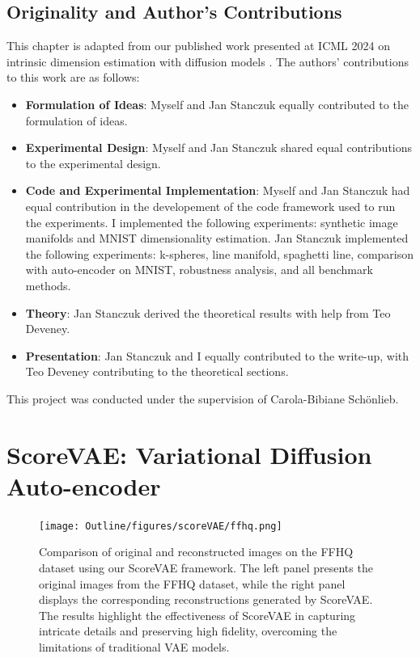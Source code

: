 \subsection*{Originality and Author’s Contributions}

This chapter is adapted from our published work presented at ICML 2024 on intrinsic dimension estimation with diffusion models \cite{pmlr-v235-stanczuk24a}. The authors' contributions to this work are as follows:

\begin{itemize}
\item \textbf{Formulation of Ideas}: Myself and Jan Stanczuk equally contributed to the formulation of ideas.
\item \textbf{Experimental Design}: Myself and Jan Stanczuk shared equal contributions to the experimental design.
\item \textbf{Code and Experimental Implementation}: Myself and Jan Stanczuk had equal contribution in the developement of the code framework used to run the experiments. I implemented the following experiments: synthetic image manifolds and MNIST dimensionality estimation. Jan Stanczuk implemented the following experiments: k-spheres, line manifold, spaghetti line, comparison with auto-encoder on MNIST, robustness analysis, and all benchmark methods.
\item \textbf{Theory}: Jan Stanczuk derived the theoretical results with help from Teo Deveney.
\item \textbf{Presentation}: Jan Stanczuk and I equally contributed to the write-up, with Teo Deveney contributing to the theoretical sections.
\end{itemize}

This project was conducted under the supervision of Carola-Bibiane Sch\"onlieb.

\section{ScoreVAE: Variational Diffusion Auto-encoder}

\begin{figure}[htbp]
    \centering
    \texttt{[image: Outline/figures/scoreVAE/ffhq.png]}
    \caption{Comparison of original and reconstructed images on the FFHQ dataset using our ScoreVAE framework. The left panel presents the original images from the FFHQ dataset, while the right panel displays the corresponding reconstructions generated by ScoreVAE. The results highlight the effectiveness of ScoreVAE in capturing intricate details and preserving high fidelity, overcoming the limitations of traditional VAE models.}
    \label{fig:ffhq}
\end{figure}


